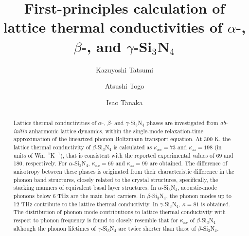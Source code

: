 \documentclass[twocolumn,amsmath,amssymb,a4paper,prb,superscriptaddress,floatfix]{revtex4-1}
\begin{document}
\title{First-principles calculation of lattice thermal
conductivities of $\alpha$-, $\beta$-, and $\gamma$-Si$_3$N$_4$}

\author{Kazuyoshi Tatsumi} 

\author{Atsushi Togo}

\author{Isao Tanaka}

\begin{abstract}
Lattice thermal conductivities of $\alpha$-, $\beta$- and $\gamma$-Si$_3$N$_4$
phases are investigated from {\it ab-initio} anharmonic lattice dynamics, within
the single-mode relaxation-time approximation of the linearized phonon Boltzmann
transport equation. At 300 K, the lattice thermal conductivity of
$\beta$-Si$_3$N$_4$ is calculated as $\kappa_{xx}=73$ and $\kappa_{zz}=198$ (in
units of Wm$^{-1}$K$^{-1}$), that is consistent with the reported experimental
values of 69 and 180, respectively. For $\alpha$-Si$_3$N$_4$, $\kappa_{xx}=69$
and $\kappa_{zz}=99$ are obtained.  The difference of anisotropy between these
phases is originated from their characteristic difference in the phonon band
structures, closely related to the crystal structures, specifically, the
stacking manners of equivalent basal layer structures.  In $\alpha$-Si$_3$N$_4$,
acoustic-mode phonons below 6 THz are the main heat carriers. In
$\beta$-Si$_3$N$_4$, the phonon modes up to 12 THz contribute to the lattice
thermal conductivity. In $\gamma$-Si$_3$N$_4$, $\kappa=81$ is obtained. The
distribution of phonon mode contributions to lattice thermal conductivity with
respect to phonon frequency is found to closely resemble that for $\kappa_{xx}$
of $\beta$-Si$_3$N$_4$ although the phonon lifetimes of $\gamma$-Si$_3$N$_4$ are
twice shorter than those of $\beta$-Si$_3$N$_4$.
\end{abstract}
\end{document}
